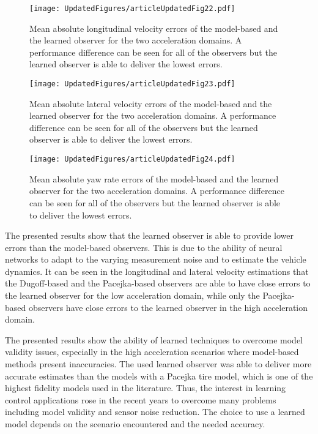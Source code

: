 \documentclass[journal]{IEEEtran}
\begin{document}
\begin{figure}[h]
    \centering
    \texttt{[image: UpdatedFigures/articleUpdatedFig22.pdf]}
    \caption{Mean absolute longitudinal velocity errors of the model-based and the learned observer for the two acceleration domains. A performance difference can be seen for all of the observers but the learned observer is able to deliver the lowest errors.}
    \label{LO_Vx.fig}
\end{figure}
\begin{figure}[h]
    \centering
    \texttt{[image: UpdatedFigures/articleUpdatedFig23.pdf]}
    \caption{Mean absolute lateral velocity errors of the model-based and the learned observer for the two acceleration domains. A performance difference can be seen for all of the observers but the learned observer is able to deliver the lowest errors.}
    \label{LO_Vy.fig}
\end{figure}
\begin{figure}[h]
    \centering
    \texttt{[image: UpdatedFigures/articleUpdatedFig24.pdf]}
    \caption{Mean absolute yaw rate errors of the model-based and the learned observer for the two acceleration domains. A performance difference can be seen for all of the observers but the learned observer is able to deliver the lowest errors.}
    \label{LO_Pd.fig}
\end{figure}

The presented results show that the learned observer is able to provide lower errors than the model-based observers. This is due to the ability of neural networks to adapt to the varying measurement noise and to estimate the vehicle dynamics. It can be seen in the longitudinal and lateral velocity estimations that the Dugoff-based and the Pacejka-based observers are able to have close errors to the learned observer for the low acceleration domain, while only the Pacejka-based observers have close errors to the learned observer in the high acceleration domain.

The presented results show the ability of learned techniques to overcome model validity issues, especially in the high acceleration scenarios where model-based methods present inaccuracies. The used learned observer was able to deliver more accurate estimates than the models with a Pacejka tire model, which is one of the highest fidelity models used in the literature. Thus, the interest in learning control applications rose in the recent years to overcome many problems including model validity and sensor noise reduction. The choice to use a learned model depends on the scenario encountered and the needed accuracy. 
\end{document}
